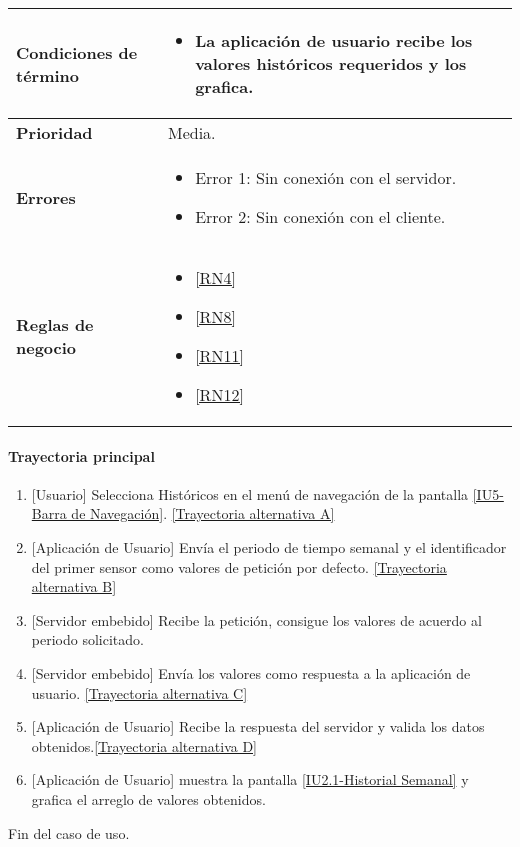 \begin{longtable}{|J{5cm}|J{10.3cm}|}
	\textbf{Condiciones de término} & 
		\begin{itemize}
			\item La aplicación de usuario recibe los valores históricos requeridos y los grafica.
		\end{itemize} \\ \hline 
	\textbf{Prioridad} & 
		Media. \\ \hline
	\textbf{Errores} & 
		\begin{itemize}
		    \item \label{CUU1.3:Error1} Error 1: Sin conexión con el servidor.
		    \item \label{CUU1.3:Error2} Error 2: Sin conexión con el cliente.
		\end{itemize} \\ \hline
	\textbf{Reglas de negocio} & 
		\begin{itemize}
		    \item \ref{RN4}
		    \item \ref{RN8}
			\item \ref{RN11}
			\item \ref{RN12}
		\end{itemize} \\ \hline
\end{longtable}

\paragraph{Trayectoria principal}
    \label{SUB-U-CU1.3:TP}
	\begin{enumerate}
	    \item {[Usuario]} Selecciona Históricos en el menú de navegación de la pantalla \hyperref[fig:Barra de navegacion]{[IU5-Barra de Navegación]}. \hyperref[SUB-U-CU1.3:TA]{[Trayectoria alternativa A]} 
		\item {[Aplicación de Usuario]} Envía el periodo de tiempo semanal y el identificador del primer sensor como valores de petición por defecto. \hyperref[SUB-U-CU1.3:TB]{[Trayectoria alternativa B]} 
		\item {[Servidor embebido]} Recibe la petición, consigue los valores de acuerdo al periodo solicitado. 
		\item {[Servidor embebido]} Envía los valores como respuesta a la aplicación de usuario. \hyperref[SUB-U-CU1.3:TC]{[Trayectoria alternativa C]}
        \item {[Aplicación de Usuario]} Recibe la respuesta del servidor y valida los datos obtenidos.\hyperref[SUB-U-CU1.3:TD]{[Trayectoria alternativa D]}
        \item {[Aplicación de Usuario]} muestra la pantalla \hyperref[fig:Historial Semanal]{[IU2.1-Historial Semanal]} y grafica el arreglo de valores obtenidos. 
	\end{enumerate}
	Fin del caso de uso.


